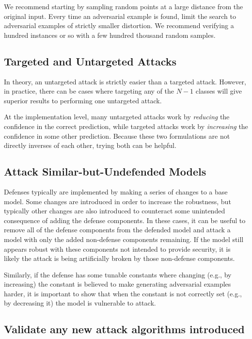 \documentclass{article} %
\begin{document}
We recommend starting by sampling random points at a large distance from the original input.
%
Every time
an adversarial example is found, limit the search to adversarial
examples of strictly smaller distortion.
%
We recommend verifying a
hundred instances or so with a few hundred thousand random samples.

\subsection{Targeted and Untargeted Attacks}
\label{sec:targeted}
In theory, an untargeted attack is strictly easier than a targeted attack.
%
However, in practice, there can be cases where targeting any of the $N-1$ classes
will give superior results to performing one untargeted attack.

At the implementation level, many untargeted attacks work by \emph{reducing}
the confidence in the correct prediction, while targeted attacks work by
\emph{increasing} the confidence in some other prediction.
%
Because these two formulations are not directly inverses of each other,
trying both can be helpful.

\subsection{Attack Similar-but-Undefended Models}
\label{sec:attacksimilar}

Defenses typically are implemented by making a series of changes
to a base model.
%
Some changes are introduced in order to increase
the robustness, but typically other changes are also introduced to
counteract some unintended consequence of adding the defense components.
%
In these cases, it can be useful to remove all of the defense
components from the defended model and attack a model with only the
added non-defense components remaining.
%
If the model still appears robust with these components not intended
to provide security, it is likely the attack is being artificially
broken by those non-defense components.

Similarly, if the defense has some tunable constants where changing
(e.g., by increasing)
the constant is believed to make generating adversarial examples
harder, it is important to show that when the constant is not
correctly set (e.g., by decreasing it) the model is vulnerable to
attack.

\subsection{Validate any new attack algorithms introduced}
\label{sec:benchmarkattack}
\end{document}
